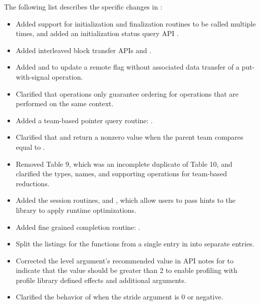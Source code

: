 The following list describes the specific changes in \openshmem[1.6]:
\begin{itemize}
%
\item Added support for initialization and finalization routines to be called
    multiple times, and added an initialization status query API
    .
%
%
\item Added interleaved block transfer APIs  and
    .
%
%
\item Added  and  to
  update a remote flag without associated data transfer of a put-with-signal operation.
%
%
\item Clarified that  operations only guarantee ordering for
    operations that are performed on the same context.
%
%
\item Added a team-based pointer query routine:
  .
%
%
\item Clarified that  and
     return a nonzero value when the parent
    team compares equal to .
%
%
\item Removed \openshmem[1.5] Table 9, which was an incomplete duplicate of
    \openshmem[1.5] Table 10, and clarified the types, names, and supporting
    operations for team-based reductions.
%
%
\item Added the session routines,  and
    , which allow users to pass hints to the
    \openshmem library to apply runtime optimizations.
%
\item Added fine grained completion routine: .
%
%
\item Split the listings for the 
  functions from a single entry in \openshmem[1.5] into separate entries.
%
\item Corrected the level argument's recommended value in API notes for
     to indicate that the value should be greater than
    2 to enable profiling with profile library defined effects and
    additional arguments.
%
\item Clarified the behavior of  when the
    stride argument is 0 or negative.
%
\end{itemize}

